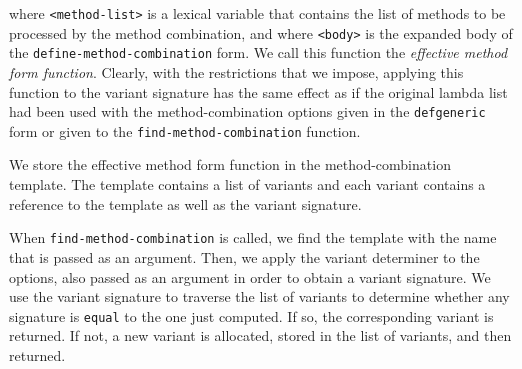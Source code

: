 where \texttt{<method-list>} is a lexical variable that contains the
list of methods to be processed by the method combination, and where
\texttt{<body>} is the expanded body of the
\texttt{define-method-combination} form.  We call this function the
\emph{effective method form function}.  Clearly, with the
restrictions that we impose, applying this function to the variant
signature has the same effect as if the original lambda list had been
used with the method-combination options given in the
\texttt{defgeneric} form or given to the
\texttt{find-method-combination} function.

We store the effective method form function in the method-combination
template.  The template contains a list of variants and each variant
contains a reference to the template as well as the variant signature.

When \texttt{find-method-combination} is called, we find the template
with the name that is passed as an argument.  Then, we apply the
variant determiner to the options, also passed as an argument in order
to obtain a variant signature.  We use the variant signature to
traverse the list of variants to determine whether any signature is
\texttt{equal} to the one just computed.  If so, the corresponding
variant is returned.  If not, a new variant is allocated, stored in
the list of variants, and then returned.
